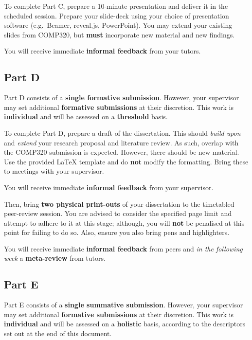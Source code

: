 To complete Part C, prepare a 10-minute presentation and deliver it in the scheduled session. Prepare your slide-deck using your choice of presentation software (e.g.\ Beamer, reveal.js, PowerPoint). You may extend your existing slides from COMP320, but \textbf{must} incorporate new material and new findings.

You will receive immediate \textbf{informal feedback} from your tutors.

\subsection*{Part D}

Part D consists of a \textbf{single formative submission}. 
However, your supervisor may set additional \textbf{formative submissions} at their discretion.
This work is \textbf{individual} and will be assessed on a \textbf{threshold} basis.

To complete Part D, prepare a draft of the dissertation. This should \textit{build upon} and \textit{extend} your research proposal and
literature review. As such, overlap with the COMP320 submission is expected. However, there should be new material.
Use the provided LaTeX template and do \textbf{not} modify the formatting. Bring these to meetings with your supervisor.

You will receive immediate \textbf{informal feedback} from your supervisor.

Then, bring \textbf{two physical print-outs} of your dissertation to the timetabled peer-review session. 
You are advised to consider the specified page limit and attempt to adhere to it at this stage; although, you will \textbf{not} be penalised at this point for failing to do so.  Also, ensure you also bring pens and highlighters.

You will receive immediate \textbf{informal feedback} from peers and \textit{in the following week} a \textbf{meta-review} from tutors.

\subsection*{Part E}

Part E consists of a \textbf{single summative submission}. However, your supervisor may set additional \textbf{formative submissions} at their discretion.
This work is \textbf{individual} and will be assessed on a \textbf{holistic} basis, according to the descriptors set out at the end of this document.

